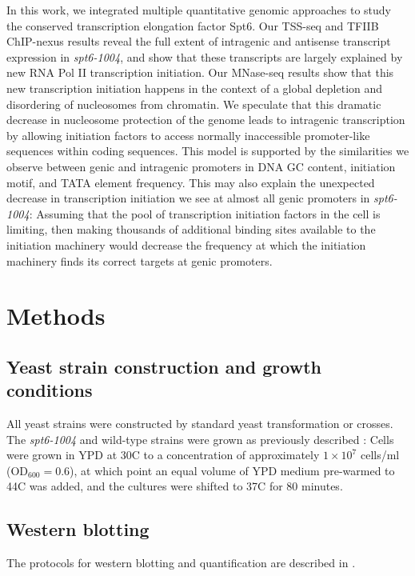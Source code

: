 In this work, we integrated multiple quantitative genomic approaches to study the conserved transcription elongation factor Spt6.
Our TSS-seq and TFIIB ChIP-nexus results reveal the full extent of intragenic and antisense transcript expression in \textit{spt6-1004}, and show that these transcripts are largely explained by new RNA Pol II transcription initiation.
Our MNase-seq results show that this new transcription initiation happens in the context of a global depletion and disordering of nucleosomes from chromatin.
We speculate that this dramatic decrease in nucleosome protection of the genome leads to intragenic transcription by allowing initiation factors to access normally inaccessible promoter-like sequences within coding sequences.
This model is supported by the similarities we observe between genic and intragenic promoters in DNA GC content, initiation motif, and TATA element frequency.
This may also explain the unexpected decrease in transcription initiation we see at almost all genic promoters in \textit{spt6-1004}: Assuming that the pool of transcription initiation factors in the cell is limiting, then making thousands of additional binding sites available to the initiation machinery would decrease the frequency at which the initiation machinery finds its correct targets at genic promoters.

\clearpage
\section{Methods}

\subsection{Yeast strain construction and growth conditions}

All yeast strains were constructed by standard yeast transformation or crosses.
The \textit{spt6-1004} and wild-type strains were grown as previously described \citep{cheung2008}: Cells were grown in YPD at 30\textdegree C to a concentration of approximately $1 \times 10^7$ cells/ml (OD$_{600} = 0.6$), at which point an equal volume of YPD medium pre-warmed to 44\textdegree C was added, and the cultures were shifted to 37\textdegree C for 80 minutes.

\subsection{Western blotting}

The protocols for western blotting and quantification are described in \citet{doris2018}.

